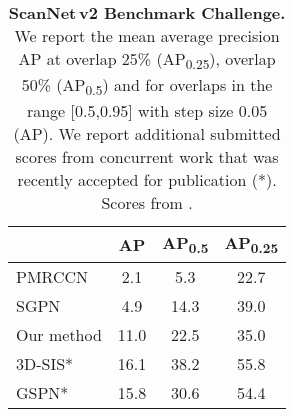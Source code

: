 \documentclass[runningheads]{llncs}
\begin{document}
{\begin{table}[t]
\begin{center}
\end{center}
\vspace{-5px}
\caption{\textbf{Category-wise AP\textsubscript{0.5} on ScanNet.} The presented scores for SGPN are extracted from \cite{Wang18CVPR}. As they did not provide scores for \textit{other furniture}, this category does not contribute to the mean score.}
\label{tab:scannet_category}
\end{table}

\begin{table}[t]
\begin{center}
\begin{tabular}{lccc}
\toprule
& AP & AP\textsubscript{0.5} & AP\textsubscript{0.25} \\
\midrule
PMRCCN \cite{Dai17ScannetBenchmark}	& 2.1 & 5.3 & 22.7 \\
SGPN \cite{Wang18CVPR} & 4.9  & 14.3  & 39.0\\
Our method	&	11.0 & 22.5 & 35.0\\
\midrule
3D-SIS* \cite{Hou18CoRR} &16.1 & 38.2  &55.8 \\
GSPN* \cite{Yi18CoRR} & 15.8& 30.6 & 54.4\\
\bottomrule
\end{tabular}
\end{center}
\vspace{-5px}
\caption{\textbf{ScanNet\,v2 Benchmark Challenge.}
We report the mean average precision AP at overlap 25\% (AP\textsubscript{0.25}), overlap 50\% (AP\textsubscript{0.5}) and for overlaps in the range [0.5,0.95] with step size 0.05 (AP). 
We report additional submitted scores from concurrent work that was recently accepted for publication (*). Scores from \cite{Dai17ScannetBenchmark}.
}
\label{tab:scannet_benchmark}
\end{table}

}
\end{document}
